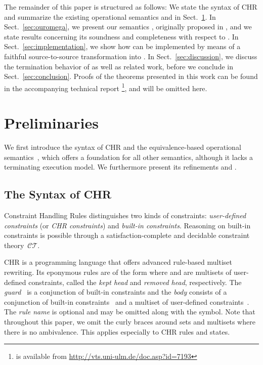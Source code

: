 \documentclass{tlp}
\newcommand{\CT}{\ensuremath{\mathcal{CT}}}
\begin{document}
The remainder of this paper is structured as follows: We state the syntax of CHR
and summarize the existing operational semantics  and  in
Sect.~\ref{sec:opsems}. In Sect.~\ref{sec:ouromega}, we present our semantics
, originally proposed in \cite{Betz2009}, and we state results concerning
its soundness and completeness with respect to . In
Sect.~\ref{sec:implementation}, we show how  can be implemented by means
of a faithful source-to-source transformation into . In
Sect.~\ref{sec:discussion}, we discuss the termination behavior of  as
well as related work, before we conclude in Sect.~\ref{sec:conclusion}.
Proofs of the theorems presented in this work can be found in the accompanying
technical report \cite{Betz2010} \footnote{\cite{Betz2010} is available from
\url{http://vts.uni-ulm.de/doc.asp?id=7193}}, and will be omitted here.

\section{Preliminaries}
\label{sec:opsems}

We first introduce the syntax of CHR and the equivalence-based operational
semantics~, which offers a foundation for all other semantics, although it
lacks a terminating execution model. We furthermore present its refinements
 and .

\subsection{The Syntax of CHR}

Constraint Handling Rules distinguishes two kinds of constraints:
\emph{user-defined constraints} (or \emph{CHR constraints}) and \emph{built-in
constraints}. Reasoning on built-in constraints is possible through a
satisfaction-complete and decidable constraint theory~\CT.

CHR is a programming language that offers advanced rule-based multiset rewriting.
Its eponymous rules are of the form  where  and  are multisets of user-defined constraints,
called the \emph{kept head} and \emph{removed head}, respectively. The
\emph{guard}~ is a conjunction of built-in constraints and the
 \emph{body} consists of a conjunction of built-in constraints~ and a
 multiset of
user-defined constraints~. The \emph{rule name}  is optional and may be
omitted along with the  symbol. Note that throughout this paper, we omit the
curly braces around sets and multisets where there is no ambivalence. This
applies especially to CHR rules and states.
\end{document}
